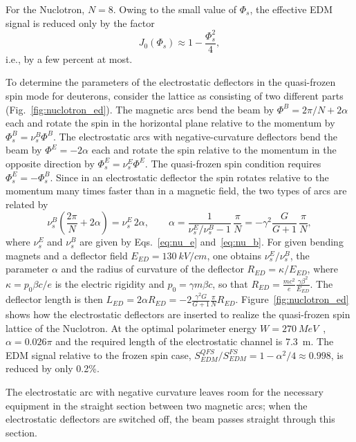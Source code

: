\documentclass[%
  aps,
  pra,
  preprint,
  a4paper,
  amsmath,
  amssymb,
  floatfix,
  longbibliography,
  superscriptaddress
]{revtex4-2}
\begin{document}
For the Nuclotron, $N = 8$. Owing to the small value of $\Phi_s$, the effective
EDM signal is reduced only by the factor
\begin{equation}
  J_0(\Phi_s) \approx 1 - \frac{\Phi_s^2}{4},
\end{equation}
i.e., by a few percent at most.

To determine the parameters of the electrostatic deflectors in the
quasi-frozen spin mode for deuterons, consider the lattice as consisting of
two different parts (Fig.~\ref{fig:nuclotron_ed}). The magnetic arcs bend the
beam by $\Phi^B = 2\pi/N + 2\alpha$ each and rotate the spin in the horizontal
plane relative to the momentum by $\Phi^B_s = \nu^B_s\Phi^B$. The electrostatic
arcs with negative-curvature deflectors bend the beam by $\Phi^E = -2\alpha$
each and rotate the spin relative to the momentum in the opposite direction by
$\Phi^E_s = \nu^E_s\Phi^E$. The quasi-frozen spin condition requires
$\Phi^E_s = -\Phi^B_s$. Since in an electrostatic deflector the spin rotates
relative to the momentum many times faster than in a magnetic field, the two
types of arcs are related by
\begin{equation}
  \nu_s^B\left(\frac{2\pi}{N}+2\alpha\right) = \nu_s^E\, 2\alpha,
  \qquad
  \alpha = \frac{1}{\nu_s^E/\nu_s^B-1}\,\frac{\pi}{N} = -\gamma^2\frac{G}{G+1}\,\frac{\pi}{N},
  \label{eq:nuclotron_alpha}
\end{equation}
where $\nu_s^E$ and $\nu_s^B$ are given by Eqs.~\eqref{eq:nu_e}
and~\eqref{eq:nu_b}. For given bending magnets and a deflector field
$E_{ED} = \SI{130}{kV/cm}$, one obtains $\nu_s^E/\nu_s^B$, the parameter
$\alpha$ and the radius of curvature of the deflector $R_{ED} = \kappa/E_{ED}$,
where $\kappa = p_0\beta c/e$ is the electric rigidity and
$p_0 = \gamma m\beta c$, so that
$R_{ED} = \frac{mc^2}{e}\frac{\gamma\beta^2}{E_{ED}}$. The deflector length is
then
$L_{ED} = 2\alpha R_{ED} = -2\frac{\gamma^2 G}{G+1}\frac{\pi}{N}R_{ED}$.
Figure~\ref{fig:nuclotron_ed} shows how the electrostatic deflectors are
inserted to realize the quasi-frozen spin lattice of the Nuclotron. At the
optimal polarimeter energy $W = \SI{270}{MeV}$~\cite{Kurilkin:2010ym},
$\alpha = 0.026\pi$ and the required length of the electrostatic channel is
\SI{7.3}{m}. The EDM signal relative to the frozen spin case,
$S^{QFS}_{EDM}/S^{FS}_{EDM} = 1-\alpha^2/4 \approx 0.998$, is reduced by only
0.2\%.

The electrostatic arc with negative curvature leaves room for the necessary
equipment in the straight section between two magnetic arcs; when the
electrostatic deflectors are switched off, the beam passes straight through
this section.
\end{document}
